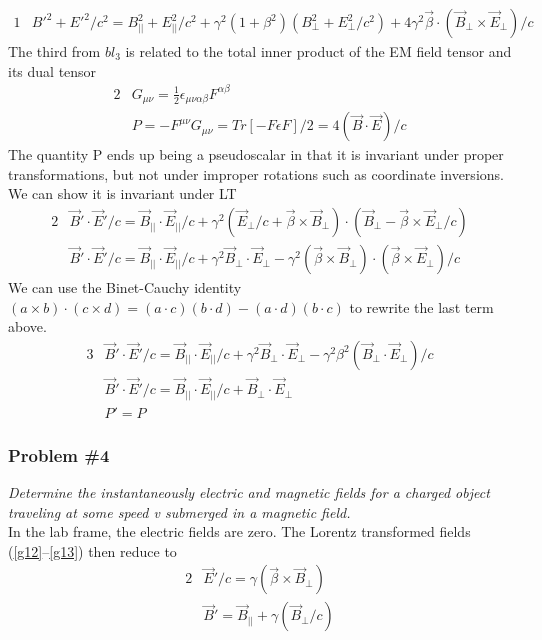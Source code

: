 \documentclass[]{article}
\numberwithin{equation}{subsection}
\begin{document}
\begin{alignat}{1}
	\label{g28}	&B'^{2}+E'^{2}/c^{2}=B^{2}_{||}+E^{2}_{||}/c^{2}+\gamma^{2}(1+\beta^{2})(B^{2}_{\perp}+E^{2}_{\perp}/c^{2})+4\gamma^{2}\vec{\beta}\cdot(\vec{B}_{\perp}\times\vec{E}_{\perp})/c
\end{alignat}
The third from $bl_{3}$ is related to the total inner product of the EM field tensor and its dual tensor
\begin{alignat}{2}
	\label{g29}	& G_{\mu\nu}=\frac{1}{2}\epsilon_{\mu\nu\alpha\beta}F^{\alpha\beta}\\
	\label{g30}	&P=-F^{\mu\nu}G_{\mu\nu}=Tr[-F\epsilon F]/2=4(\vec{B}\cdot\vec{E})/c
\end{alignat}
The quantity P ends up being a pseudoscalar in that it is invariant under proper transformations, but not under improper rotations such as coordinate inversions. We can show it is invariant under LT
\begin{alignat}{2}
	\label{g31}	&\vec{B}'\cdot\vec{E}'/c=\vec{B}_{||}\cdot\vec{E}_{||}/c+\gamma^{2}(\vec{E}_{\perp}/c+\vec{\beta}\times\vec{B}_{\perp})\cdot(\vec{B}_{\perp}-\vec{\beta}\times\vec{E}_{\perp}/c)\\
	\label{g32}	&\vec{B}'\cdot\vec{E}'/c=\vec{B}_{||}\cdot\vec{E}_{||}/c+\gamma^{2}\vec{B}_{\perp}\cdot\vec{E}_{\perp}-\gamma^{2}(\vec{\beta}\times\vec{B}_{\perp})\cdot(\vec{\beta}\times\vec{E}_{\perp})/c
\end{alignat}
We can use the Binet-Cauchy identity $(a\times b)\cdot(c\times d)=(a\cdot c)(b\cdot d)-(a\cdot d)(b\cdot c)$ to rewrite the last term above.
\begin{alignat}{3}
	\label{g33}	&\vec{B}'\cdot\vec{E}'/c=\vec{B}_{||}\cdot\vec{E}_{||}/c+\gamma^{2}\vec{B}_{\perp}\cdot\vec{E}_{\perp}-\gamma^{2}\beta^{2}(\vec{B}_{\perp}\cdot\vec{E}_{\perp})/c\\
	\label{g34}	&\vec{B}'\cdot\vec{E}'/c=\vec{B}_{||}\cdot\vec{E}_{||}/c+\vec{B}_{\perp}\cdot\vec{E}_{\perp}\\
	\label{g35}	&P'=P
\end{alignat}
\subsubsection*{Problem \#4}
\emph{Determine the instantaneously electric and magnetic fields for a charged object traveling at some speed v submerged in a magnetic field.}\\

\noindent In the lab frame, the electric fields are zero. The Lorentz transformed fields (\ref{g12}--\ref{g13}) then reduce to
\begin{alignat}{2}
	\label{g36}	&\vec{E}'/c=\gamma(\vec{\beta}\times\vec{B}_{\perp})\\
	\label{g37}	&\vec{B}'=\vec{B}_{||}+\gamma(\vec{B}_{\perp}/c)
\end{alignat}
\end{document}
